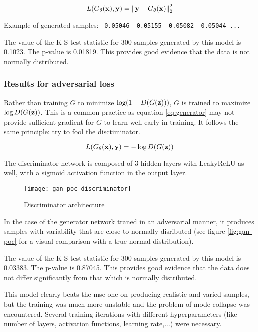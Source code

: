 \documentclass[../main.tex]{subfiles}
\begin{document}
\begin{equation}\label{eq:mse}
L(G_{\theta}(\mathbf{x}), \mathbf{y}) =
\left\| \mathbf{y} - G_{\theta}(\mathbf{x}) \right\|_2^2
\end{equation}

Example of generated samples:
\verb|-0.05046 -0.05155 -0.05082 -0.05044 ...|

The value of the K-S test statistic for 300 samples generated by this model is 0.1023.
The p-value is 0.01819. This provides good evidence that the data is not
normally distributed.

\subsubsection{Results for adversarial loss}
Rather than training $G$ to minimize $\log (1 - D(G(\mathbf{z})))$,
$G$ is trained to maximize $\log D(G(\mathbf{z}))$.
This is a common practice as equation
\eqref{eq:generator} may not provide sufficient gradient for $G$ to learn well
early in training. It follows the same principle: try to fool the disctiminator.

\begin{equation}
L(G_{\theta}(\mathbf{x}), \mathbf{y}) = - \log D(G(\mathbf{z}))
\end{equation}

The discriminator network is composed of 3 hidden layers with LeakyReLU as well,
with a sigmoid activation function in the output layer.

\begin{figure}[h]
\centering
\texttt{[image: gan-poc-discriminator]}
\caption{Discriminator architecture}
\label{fig:gan-poc-discriminator}
\end{figure}

In the case of the generator network traned in an adversarial manner,
it produces samples with variability that are close to normally disributed
(see figure \ref{fig:gan-poc} for a visual comparison with a true normal
distribution).

The value of the K-S test statistic for 300 samples generated by this model is 0.03383.
The p-value is 0.87045. This provides good evidence that the data does
not differ significantly from that which is normally distributed.

This model clearly beats the \gls{mse} one on producing realistic and varied
samples, but the training was much more unstable and the problem of mode
collapse was encountered. Several training iterations with different
hyperparameters (like number of layers, activation functions, learning rate,...)
were necessary.
\end{document}
